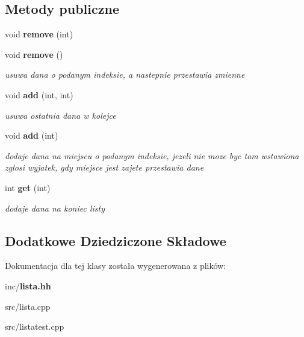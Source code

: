 \subsection*{Metody publiczne}
\begin{DoxyCompactItemize}
\item 
void {\bfseries remove} (int)\label{classlista_a567ac3ce85a3a7d7b10a3b0aafed56dd}

\item 
void {\bf remove} ()\label{classlista_af1900e0adeee6f2bf55c3b01c94b5e42}

\begin{DoxyCompactList}\small\item\em usuwa dana o podanym indeksie, a nastepnie przestawia zmienne \end{DoxyCompactList}\item 
void {\bf add} (int, int)\label{classlista_abbc313e4d15605053e317b28246146bf}

\begin{DoxyCompactList}\small\item\em usuwa ostatnia dana w kolejce \end{DoxyCompactList}\item 
void {\bf add} (int)\label{classlista_aa3b586da2830b20ca5818509a34ed6a6}

\begin{DoxyCompactList}\small\item\em dodaje dana na miejscu o podanym indeksie, jezeli nie moze byc tam wstawiona zglosi wyjatek, gdy miejsce jest zajete przestawia dane \end{DoxyCompactList}\item 
int {\bf get} (int)\label{classlista_aca7a3313138e7033678c32b625fd5473}

\begin{DoxyCompactList}\small\item\em dodaje dana na koniec listy \end{DoxyCompactList}\end{DoxyCompactItemize}
\subsection*{Dodatkowe Dziedziczone Składowe}


Dokumentacja dla tej klasy została wygenerowana z plików\+:\begin{DoxyCompactItemize}
\item 
inc/{\bf lista.\+hh}\item 
src/lista.\+cpp\item 
src/listatest.\+cpp\end{DoxyCompactItemize}
